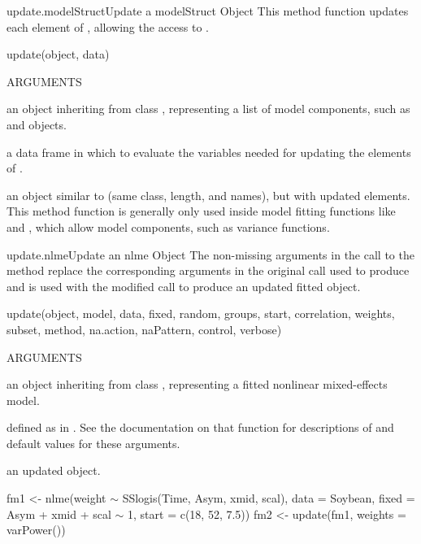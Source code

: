 \documentclass[pdftex]{article} \usepackage{url,graphicx}
\renewcommand{\Twiddle}{\mbox{\(\sim\)}}
\begin{document}
\begin{Helpfile}{update.modelStruct}{Update a modelStruct Object}
This method function updates each element of , allowing
the access to .
\begin{Example}
update(object, data)
\end{Example}
\begin{Argument}{ARGUMENTS}
\item[\Co{object:}]
an object inheriting from class ,
representing a list of model components, such as  and
 objects.
\item[\Co{data:}]
a data frame in which to evaluate the variables needed for
updating the elements of . 
\end{Argument}
an object similar to  (same class, length, and names),
but with updated elements.
 This method function is generally only used inside model fitting
functions like  and , which allow model
components, such as variance functions.
\end{Helpfile}
\begin{Helpfile}{update.nlme}{Update an nlme Object}
The non-missing arguments in the call to the  method
replace the corresponding arguments in the original call used to
produce  and  is used with the modified call to
produce an updated fitted object.
\begin{Example}
update(object, model, data, fixed, random, groups, start,
       correlation, weights, subset, method, na.action, 
       naPattern, control, verbose)
\end{Example}
\begin{Argument}{ARGUMENTS}
\item[\Co{object:}]
an object inheriting from class , representing
a fitted nonlinear mixed-effects model.
\item[\Co{other arguments:}]
defined as in . See the
documentation on that function for descriptions of and default values
for these arguments.
\end{Argument}
an updated  object.
\need 15pt
\vspace{-16pt}
\begin{Example}
fm1 <- nlme(weight {\Twiddle} SSlogis(Time, Asym, xmid, scal), 
            data = Soybean, fixed = Asym + xmid + scal {\Twiddle} 1, 
            start = c(18, 52, 7.5))
fm2 <- update(fm1, weights = varPower())
\end{Example}
\end{Helpfile}
\end{document}
